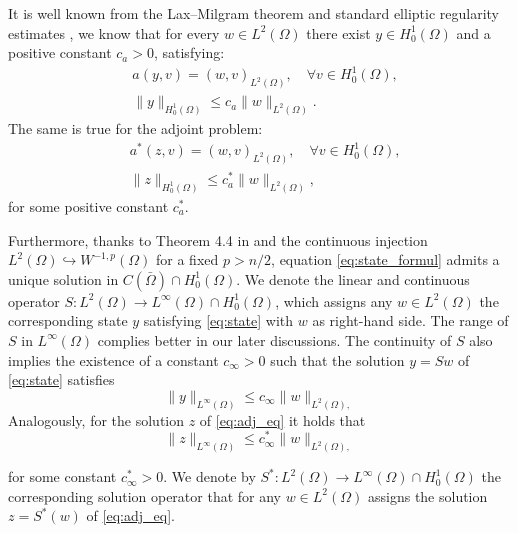 \documentclass[11pt,a4paper]{amsart}
\newcommand{\om}{\Omega}
\newcommand{\norm}[1]{\lVert #1 \rVert}
\begin{document}
	It is well known from the Lax–Milgram theorem and standard elliptic regularity estimates \cite{brezis2010}, we know that for every $w \in L^2(\om)$ there exist $y\in H_0^1(\om)$ and a positive constant $c_a>0$, satisfying: 
	\begin{subequations}\label{eq:state_formul}
		\begin{align}
			&a(y,v) = (w,v)_{L^2(\om)}, \quad \forall v \in H_0^1(\om),\label{eq:state}\\
			&\norm{y}_{H_0^1(\om)} \leq c_a\norm{w}_{L^2(\om)}. \label{eq:state_continuity}
		\end{align}
	\end{subequations}
 The same is true for the adjoint problem:
	\begin{subequations}\label{eq:adj_eq}
		\begin{align}
			&a^*(z,v) = (w,v)_{L^2(\om)}, \quad \forall v \in H_0^1(\om),\label{eq:state*}\\
			&\norm{z}_{H_0^1(\om)} \leq c_a^*\norm{w}_{L^2(\om)}\label{eq:esti_state*},
		\end{align}
	\end{subequations}
for some positive constant $c_a^*$.  

Furthermore, thanks to Theorem 4.4 in \cite{stampacchia65} and the continuous injection $L^2(\om) \hookrightarrow W^{-1,p}(\om)$ for a fixed $p>n/2$, equation \eqref{eq:state_formul} admits a unique solution in $C(\bar\om)\cap H_0^1(\om)$. We denote the linear and continuous operator $S:L^2(\om)\to L^{\infty}(\om)\cap H_0^1(\om)$, which assigns any $w\in L^2(\om)$  the corresponding state $y$  satisfying \eqref{eq:state} with $w$ as right-hand side. The range of $S$ in $L^\infty(\om)$ complies better in our later discussions. The continuity of $S$ also implies the existence of a constant $c_{\infty}>0$ such that the solution $y=Sw$ of \eqref{eq:state} satisfies
\begin{equation}\label{eq:esti_state_uniform}
    \norm{y}_{L^{\infty}(\om)}\le c_{\infty}\norm{w}_{L^2(\om),}
\end{equation}
Analogously, for the solution $z$ of \eqref{eq:adj_eq} it holds that 
\begin{equation}\label{eq:esti_state*_uniform}
    \norm{z}_{L^{\infty}(\om)}\le c_{\infty}^*\norm{w}_{L^2(\om),}
\end{equation}

for some constant $c_{\infty}^*>0$. We denote by $S^*:L^2(\om)\to L^{\infty}(\om)\cap H_0^1(\om)$ the corresponding solution  operator that for any $w\in L^2(\om)$ assigns the solution $z=S^*(w)$ of \eqref{eq:adj_eq}. 
\end{document}
